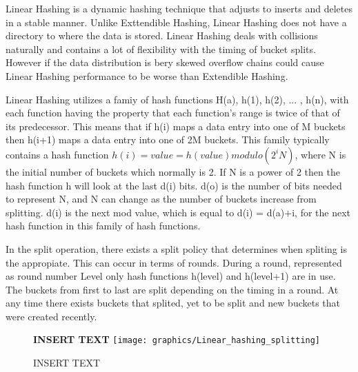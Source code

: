 \documentclass[letterpaper, 12pt]{article}
\begin{document}
Linear Hashing is a dynamic hashing technique that adjusts to inserts and deletes in a stable manner. 
Unlike Exttendible Hashing, Linear Hashing does not have a directory to where the data is 
stored. Linear Hashing deals with collisions naturally and contains a lot of flexibility with 
the timing of bucket splits. However if the data distribution is bery skewed overflow chains could cause Linear Hashing performance to be
worse than Extendible Hashing.
\par\vspace{\baselineskip}
Linear Hashing utilizes a famiy of hash functions H(a), h(1), h(2), ... , h(n), with each function having the property that each function's
range is twice of that of its predecessor. This means that if h(i) maps a data entry into one of M buckets then h(i+1) maps a data entry into one
of 2M buckets. This family typically contains a hash function $ h(i) = value = h(value) modulo (2^i N) $, where N is the initial number of buckets
which normally is 2. If N is a power of 2 then the hash function h will look at the last d(i) bits. d(o) is the number of bits needed to represent
N, and N can change as the number of buckets increase from splitting. d(i) is the next mod value, which is equal to d(i) = d(a)+i, for the next hash function
in this family of hash functions.
\par\vspace{\baselineskip}
In the split operation, there exists a split policy that determines when spliting is the appropiate. This can occur in terms of rounds. During a round, represented
as round number Level only hash functions h(level) and h(level+1) are in use. The buckets from first to last are split depending on the timing in a round. At any
time there exists buckets that splited, yet to be split and new buckets that were created recently. 
\par\vspace{\baselineskip}
\begin{figure}
  \centering
  \textbf{INSERT TEXT}
  \texttt{[image: graphics/Linear\_hashing\_splitting]}
  \caption{INSERT TEXT}
\end{figure}
\end{document}
